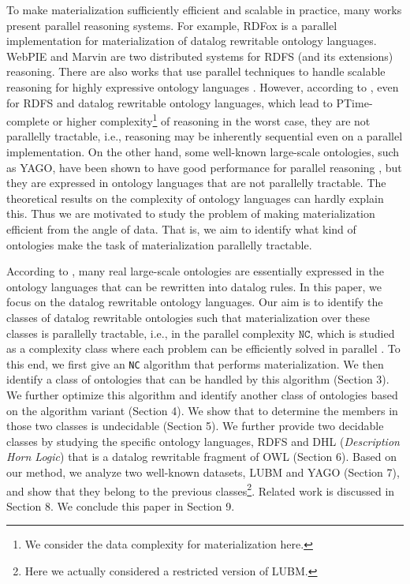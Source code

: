 \documentclass{article}
\begin{document}
To make materialization sufficiently efficient and scalable in practice, many works present parallel reasoning systems. For example, RDFox \cite{DBLP:conf/aaai/MotikNPHO14} is a parallel implementation for materialization of datalog rewritable ontology languages. WebPIE \cite{DBLP:journals/ws/UrbaniKMHB12} and Marvin \cite{oren2009marvin} are two distributed systems for RDFS (and its extensions) reasoning. There are also works that use parallel techniques to handle scalable reasoning for highly expressive ontology languages \cite{DBLP:conf/dlog/SchlichtS08,DBLP:conf/dlog/WuH12}. However, according to \cite{RAYMOND-GREENLAW}, even for RDFS and datalog rewritable ontology languages, which lead to PTime-complete or higher complexity\footnote{We consider the data complexity for materialization here.} of reasoning in the worst case, they are not parallelly tractable, i.e., reasoning may be inherently sequential even on a parallel implementation. On the other hand, some well-known large-scale ontologies, such as YAGO, have been shown to have good performance for parallel reasoning \cite{DBLP:conf/icde/SundaraAKDWCS10}, but they are expressed in ontology languages that are not parallelly tractable. The theoretical results on the complexity of ontology languages can hardly explain this. Thus we are motivated to study the problem of making materialization efficient from the angle of data. That is, we aim to identify what kind of ontologies make the task of materialization parallelly tractable.

According to \cite{DBLP:conf/aaai/MotikNPHO14}, many real large-scale ontologies are essentially expressed in the ontology languages that can be rewritten into datalog rules. In this paper, we focus on the datalog rewritable ontology languages.
Our aim is to identify the classes of datalog rewritable ontologies such that materialization
over these classes is parallelly tractable, i.e., in the parallel complexity $\texttt{NC}$, which is studied as a complexity class where each problem can be efficiently solved in parallel \cite{RAYMOND-GREENLAW}. To this end, we first
give an \texttt{NC} algorithm that performs materialization. We then identify a class of ontologies that can be handled
by this algorithm (Section 3). We further optimize this algorithm and identify another class of ontologies based on the algorithm variant (Section 4). We show that to determine the members in those two classes is undecidable (Section 5). We further provide
two decidable classes by studying the specific ontology languages, RDFS and DHL (\emph{Description Horn Logic}) that is
a datalog rewritable fragment of OWL \cite{DBLP:conf/www/GrosofHVD03} (Section 6).
Based on our method, we analyze two well-known datasets, LUBM and YAGO (Section 7), and show that they belong to the previous classes\footnote{Here we actually considered a restricted version of LUBM.}. Related work is discussed in Section 8. We conclude this paper in Section 9.
\end{document}
